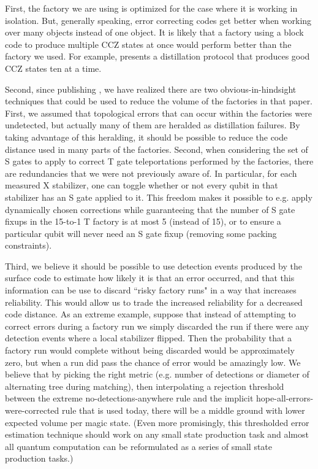 \documentclass[a4paper, onecolumn, accepted=2021-03-29]{quantumarticle}
\begin{document}
First, the factory we are using is optimized for the case where it is working in isolation.
But, generally speaking, error correcting codes get better when working over many objects instead of one object.
It is likely that a factory using a block code to produce multiple CCZ states at once would perform better than the factory we used.
For example, \cite{haah2018codes} presents a distillation protocol that produces good CCZ states ten at a time.

Second, since publishing \cite{gidney2018magic}, we have realized there are two obvious-in-hindsight techniques that could be used to reduce the volume of the factories in that paper.
First, we assumed that topological errors that can occur within the factories were undetected, but actually many of them are heralded as distillation failures.
By taking advantage of this heralding, it should be possible to reduce the code distance used in many parts of the factories.
Second, when considering the set of S gates to apply to correct T gate teleportations performed by the factories, there are redundancies that we were not previously aware of.
In particular, for each measured X stabilizer, one can toggle whether or not every qubit in that stabilizer has an S gate applied to it.
This freedom makes it possible to e.g. apply dynamically chosen corrections while guaranteeing that the number of S gate fixups in the 15-to-1 T factory is at most 5 (instead of 15), or to ensure a particular qubit will never need an S gate fixup (removing some packing constraints).

Third, we believe it should be possible to use detection events produced by the surface code to estimate how likely it is that an error occurred, and that this information can be use to discard ``risky factory runs" in a way that increases reliability.
This would allow us to trade the increased reliability for a decreased code distance.
As an extreme example, suppose that instead of attempting to correct errors during a factory run we simply discarded the run if there were any detection events where a local stabilizer flipped.
Then the probability that a factory run would complete without being discarded would be approximately zero, but when a run did pass the chance of error would be amazingly low.
We believe that by picking the right metric (e.g. number of detections or diameter of alternating tree during matching), then interpolating a rejection threshold between the extreme no-detections-anywhere rule and the implicit hope-all-errors-were-corrected rule that is used today, there will be a middle ground with lower expected volume per magic state.
(Even more promisingly, this thresholded error estimation technique should work on any small state production task and almost all quantum computation can be reformulated as a series of small state production tasks.)
\end{document}
